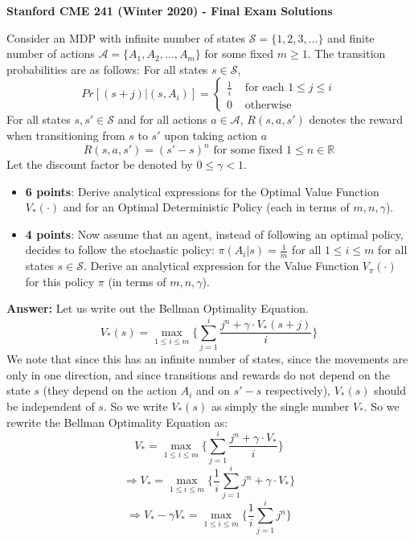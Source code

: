 \documentclass[12pt]{exam}
\begin{document}
\begin{center}
{\large {\bf Stanford CME 241 (Winter 2020) - Final Exam Solutions}}
 
\end{center}
\vspace{5mm}
 
\begin{questions}

\question Consider an MDP with infinite number of states $\mathcal{S} = \{1,2,3, \ldots \}$ and finite number of actions $\mathcal{A} = \{A_1, A_2, \ldots, A_m\}$ for some fixed $m\geq 1$. The transition probabilities are as follows:
For all states $s \in \mathcal{S}$,
$$
Pr[(s+j)|(s,A_i)] =
\begin{cases}
\frac 1 i & \text{ for each } 1\leq j \leq i\\
0 & \text{ otherwise}
\end{cases}
$$
For all states $s, s' \in \mathcal{S}$ and for all actions $a \in \mathcal{A}$, $R(s,a,s')$ denotes the reward when transitioning from $s$ to $s'$ upon taking action $a$
$$R(s,a,s') = (s'-s)^n \text{ for some fixed } 1 \leq n \in \mathbb{R}$$
Let the discount factor be denoted by $0 \leq \gamma < 1$.
\begin{itemize}
\item {\bf 6 points}: Derive analytical expressions for the Optimal Value Function $V_*(\cdot)$ and for an Optimal Deterministic Policy (each in terms of $m, n, \gamma$).
\item {\bf 4 points}: Now assume that an agent, instead of following an optimal policy, decides to follow the stochastic policy: $\pi(A_i|s) = \frac 1 m$ for all $1 \leq i \leq m$ for all states $s \in \mathcal{S}$. Derive an analytical expression for the Value Function $V_{\pi}(\cdot)$ for this policy $\pi$ (in terms of $m, n, \gamma$).
\end{itemize}

{\bf Answer: } Let us write out the Bellman Optimality Equation.
$$V_*(s) = \max_{1\leq i \leq m} \{ \sum_{j=1}^i \frac {j^n + \gamma \cdot V_*(s+j)} {i}  \}$$ 
We note that since this has an infinite number of states, since the movements are only in one direction, and since transitions and rewards do not depend on the state $s$ (they depend on the action $A_i$ and on $s'-s$ respectively), $V_*(s)$ should be independent of $s$. So we write $V_*(s)$ as simply the single number $V_*$. So we rewrite the Bellman Optimality Equation as:
$$V_* = \max_{1\leq i \leq m} \{ \sum_{j=1}^i \frac {j^n + \gamma \cdot V_*} i  \}$$
$$\Rightarrow V_* = \max_{1\leq i \leq m} \{ \frac 1 i \sum_{j=1}^i j^n + \gamma \cdot V_*  \}$$
$$\Rightarrow V_* - \gamma V_* = \max_{1\leq i \leq m} \{ \frac 1 i \sum_{j=1}^i j^n \}$$


\end{questions}
\end{document}
